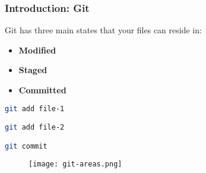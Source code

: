 \begin{frame}[fragile]

\frametitle{Introduction: Git}

\begin{multicols}{2}
Git has three main states that your files can reside in:

\begin{itemize}[<+->]
\item \textbf{Modified}
\item \textbf{Staged}
\item \textbf{Committed}
\end{itemize}

\begin{lstlisting}[language=Bash]
git add file-1

git add file-2

git commit
\end{lstlisting}

\end{multicols}

\begin{figure}
\centering
\texttt{[image: git-areas.png]}

\end{figure}

\end{frame}